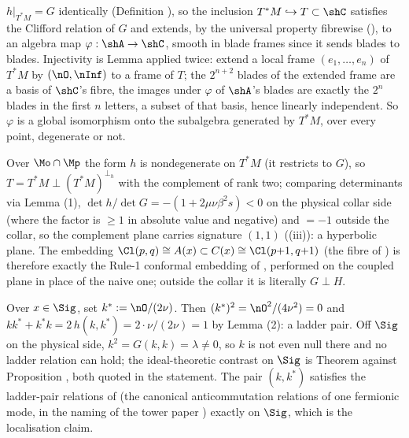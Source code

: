 $h|_{T^*M} = G$ identically (Definition ), so the inclusion $T^*M \hookrightarrow T \subset \shC$ satisfies the Clifford relation of $G$ and extends, by the universal property fibrewise (), to an algebra map $\varphi : \shA \to \shC$, smooth in blade frames since it sends blades to blades. Injectivity is Lemma  applied twice: extend a local frame $(e_1, \dots, e_n)$ of $T^*M$ by $(\nO, \nInf)$ to a frame of $T$; the $2^{n+2}$ blades of the extended frame are a basis of $\shC$'s fibre, the images under $\varphi$ of $\shA$'s blades are exactly the $2^n$ blades in the first $n$ letters, a subset of that basis, hence linearly independent. So $\varphi$ is a global isomorphism onto the subalgebra generated by $T^*M$, over every point, degenerate or not.

Over $\Mo \cap \Mp$ the form $h$ is nondegenerate on $T^*M$ (it restricts to $G$), so $T = T^*M \perp (T^*M)^{\perp_h}$ with the complement of rank two; comparing determinants via Lemma (1), $\det h / \det G = -(1 + 2\mu\nu\beta^2 s) < 0$ on the physical collar side (where the factor is $\geq 1$ in absolute value and negative) and $= -1$ outside the collar, so the complement plane carries signature $(1,1)$ ((iii)): a hyperbolic plane. The embedding $\Cl(p,q) \cong A(x) \subset C(x) \cong \Cl(p{+}1, q{+}1)$ (the fibre of ) is therefore exactly the Rule-1 conformal embedding of \cite[\S4.3]{ButlerT1}, performed on the coupled plane in place of the naive one; outside the collar it is literally $G \perp H$.

Over $x \in \Sig$, set $k^* := \nO/(2\nu)$. Then $(k^*)^2 = \nO^2/(4\nu^2) = 0$ and $k k^* + k^* k = 2\,h(k, k^*) = 2 \cdot \nu/(2\nu) = 1$ by Lemma (2): a ladder pair. Off $\Sig$ on the physical side, $k^2 = G(k,k) = \lambda \neq 0$, so $k$ is not even null there and no ladder relation can hold; the ideal-theoretic contrast on $\Sig$ is Theorem  against Proposition , both quoted in the statement. The pair $(k, k^*)$ satisfies the ladder-pair relations of \cite[\S7]{ButlerT1} (the canonical anticommutation relations of one fermionic mode, in the naming of the tower paper \cite{ButlerT3}) exactly on $\Sig$, which is the localisation claim.
